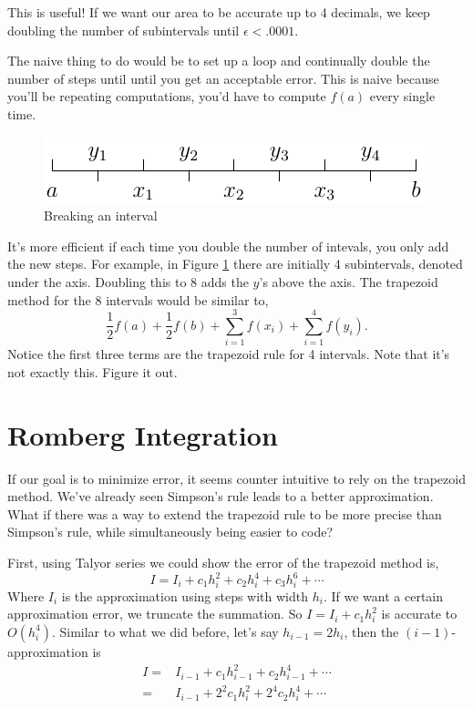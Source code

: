 \documentclass[11pt,letterpaper]{article}
\begin{document}
This is useful! If we want our area to be accurate up to 4 decimals, we keep doubling the 
number of subintervals until $\epsilon<.0001$.

The naive thing to do would be to set up a loop and continually double the number of steps until
until you get an acceptable error. This is naive because you'll be repeating computations, you'd
have to compute $f(a)$ every single time. 
\begin{figure}[!ht]
 \centering
 \includegraphics{images/interval.pdf}
 \caption{Breaking an interval}
 \label{fig:interval}
\end{figure}
It's more efficient if each time you double the number of intevals, you only add the new steps.
For example, in Figure \ref{fig:interval} there are initially 4 subintervals, denoted under the 
axis. Doubling this to 8 adds the $y$'s above the axis. The trapezoid method for the 8 intervals
would be similar to,
\[
\frac{1}{2}f(a)+\frac{1}{2}f(b) + \sum_{i=1}^3 f(x_i) + \sum_{i=1}^4 f(y_i).
\]
Notice the first three terms are the trapezoid rule for 4 intervals. Note that it's not exactly
this. Figure it out.


\section{Romberg Integration}
If our goal is to minimize error, it seems counter intuitive to rely on the trapezoid method. We've
already seen Simpson's rule leads to a better approximation. What if there was a way to extend the
trapezoid rule to be more precise than Simpson's rule, while simultaneously being easier to code?

First, using Talyor series we could show the error of the trapezoid method is,
\begin{equation}
 I = I_i + c_1h_i^2 + c_2h_i^4 + c_3h_i^6+\cdots
\label{eqn:traperr}
\end{equation}
Where $I_i$ is the approximation using steps with width $h_i$. If we want a certain approximation
error, we truncate the summation. So $I = I_i+c_1h_i^2$ is accurate to $O(h_i^4)$. Similar to 
what we did before, let's say $h_{i-1} = 2h_i$, then the $(i-1)$-approximation is
\begin{align}
 I = & I_{i-1}+c_1h_{i-1}^2 + c_2h_{i-1}^4 + \cdots \nonumber\\
   =  & I_{i-1} + 2^2 c_1h_i^2 + 2^4c_2h_i^4+\cdots \label{eqn:trapsmall}
\end{align}
\end{document}
